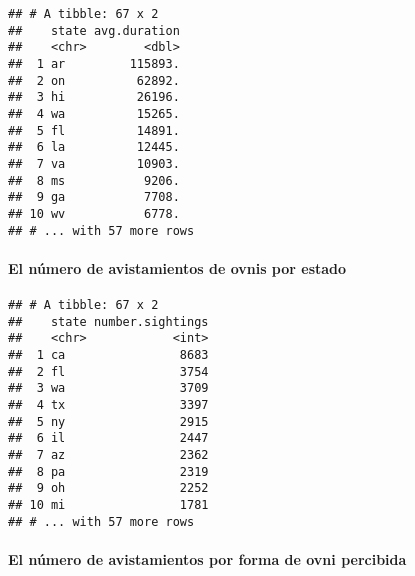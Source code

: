 \documentclass[]{article}
\newenvironment{Shaded}{\begin{snugshade}}{\end{snugshade}}
\newcommand{\KeywordTok}[1]{\textcolor[rgb]{0.13,0.29,0.53}{\textbf{#1}}}
\newcommand{\DataTypeTok}[1]{\textcolor[rgb]{0.13,0.29,0.53}{#1}}
\newcommand{\StringTok}[1]{\textcolor[rgb]{0.31,0.60,0.02}{#1}}
\newcommand{\OperatorTok}[1]{\textcolor[rgb]{0.81,0.36,0.00}{\textbf{#1}}}
\newcommand{\NormalTok}[1]{#1}
\let\oldparagraph\paragraph
\renewcommand{\paragraph}[1]{\oldparagraph{#1}\mbox{}}
\begin{document}
\begin{verbatim}
## # A tibble: 67 x 2
##    state avg.duration
##    <chr>        <dbl>
##  1 ar         115893.
##  2 on          62892.
##  3 hi          26196.
##  4 wa          15265.
##  5 fl          14891.
##  6 la          12445.
##  7 va          10903.
##  8 ms           9206.
##  9 ga           7708.
## 10 wv           6778.
## # ... with 57 more rows
\end{verbatim}

\paragraph{El número de avistamientos de ovnis por
estado}\label{el-nuxfamero-de-avistamientos-de-ovnis-por-estado}

\begin{Shaded}
\end{Shaded}

\begin{verbatim}
## # A tibble: 67 x 2
##    state number.sightings
##    <chr>            <int>
##  1 ca                8683
##  2 fl                3754
##  3 wa                3709
##  4 tx                3397
##  5 ny                2915
##  6 il                2447
##  7 az                2362
##  8 pa                2319
##  9 oh                2252
## 10 mi                1781
## # ... with 57 more rows
\end{verbatim}

\paragraph{El número de avistamientos por forma de ovni
percibida}\label{el-nuxfamero-de-avistamientos-por-forma-de-ovni-percibida}

\begin{Shaded}
\end{Shaded}
\end{document}
